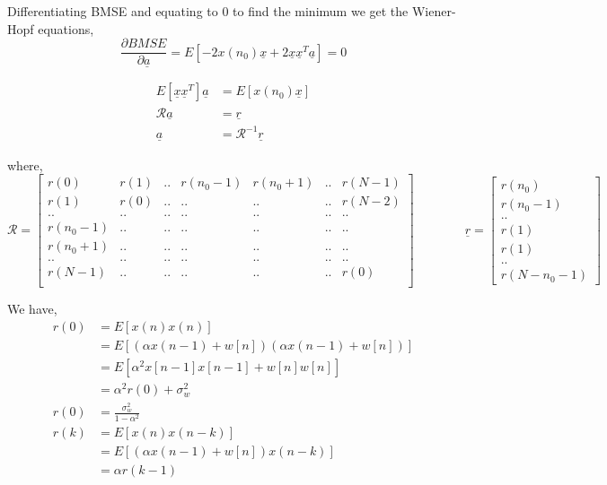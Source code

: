 \documentclass[a4 paper]{article}
\begin{document}
Differentiating BMSE and equating to 0 to find the minimum we get the Wiener-Hopf equations,
\begin{equation*}
	\frac{\partial BMSE}{\partial \underline{a}} = E[-2 x(n_{0})\underline{x} + 2 \underline{x} \underline{x}^{T} \underline{a} ] = 0
\end{equation*}

\newpage

\begin{align*}
	E[\underline{x} \underline{x}^{T}] \underline{a} &= E[x(n_{0})\underline{x}]	\\
	\mathcal{R} \underline{a} &= \underline{r}	\\
	\underline{a} &= \mathcal{R}^{-1} \underline{r}
\end{align*}

where, 
\[
\mathcal{R} = 
\begin{bmatrix}
	r(0)	& r(1)	& ..	& r(n_{0}-1)	& r(n_{0}+1)	& ..	& r(N-1)	\\
	r(1)	& r(0)	& ..	& ..			& ..			& ..	& r(N-2)	\\	
	..	& ..	& ..	& ..			& ..			& ..	& ..	\\	
	r(n_{0}-1)	& ..	& ..	& ..			& ..			& ..	& ..	\\	
	r(n_{0}+1)	& ..	& ..	& ..			& ..			& ..	& ..	\\	
	..	& ..	& ..	& ..			& ..			& ..	& ..	\\	
	r(N-1)	& ..	& ..	& ..			& ..			& ..	& r(0)	\\	
\end{bmatrix}
\hspace{4em}
\underline{r} = 
\begin{bmatrix}
	r(n_{0})	\\ r(n_{0} -1)	\\ ..	\\ r(1)	\\ r(1)	\\ ..	\\ r(N-n_{0} -1) 
\end{bmatrix}
\]

We have,
\begin{align*}
	r(0) &= E[x(n)x(n)]	\\
		&= E[(\alpha x(n-1) + w[n]) (\alpha x(n-1) + w[n])]	\\
		&= E[\alpha^{2} x[n-1]x[n-1] + w[n] w[n]]	\\
		&= \alpha^{2} r(0) + \sigma_{w}^{2}	\\
	r(0) &= \frac{\sigma_{w}^{2}}{1 - \alpha^{2}}	\\
	r(k) &= E[x(n)x(n-k)]	\\
		&= E[(\alpha x(n-1) + w[n]) x(n-k)]	\\
		&= \alpha r(k-1)
\end{align*}
\end{document}
